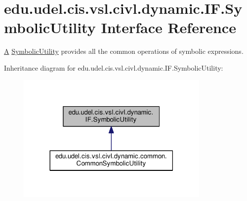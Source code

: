 \hypertarget{interfaceedu_1_1udel_1_1cis_1_1vsl_1_1civl_1_1dynamic_1_1IF_1_1SymbolicUtility}{}\section{edu.\+udel.\+cis.\+vsl.\+civl.\+dynamic.\+I\+F.\+Symbolic\+Utility Interface Reference}
\label{interfaceedu_1_1udel_1_1cis_1_1vsl_1_1civl_1_1dynamic_1_1IF_1_1SymbolicUtility}


\hyperlink{structA}{A} \hyperlink{interfaceedu_1_1udel_1_1cis_1_1vsl_1_1civl_1_1dynamic_1_1IF_1_1SymbolicUtility}{Symbolic\+Utility} provides all the common operations of symbolic expressions.  




Inheritance diagram for edu.\+udel.\+cis.\+vsl.\+civl.\+dynamic.\+I\+F.\+Symbolic\+Utility\+:
\nopagebreak
\begin{figure}[H]
\begin{center}
\leavevmode
\includegraphics[width=266pt]{interfaceedu_1_1udel_1_1cis_1_1vsl_1_1civl_1_1dynamic_1_1IF_1_1SymbolicUtility__inherit__graph}
\end{center}
\end{figure}
